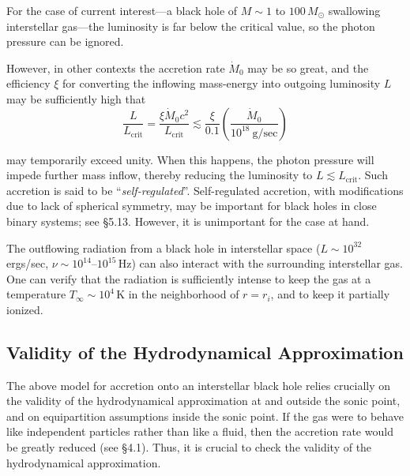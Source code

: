 For the case of current interest---a black hole of $M\sim 1$ to $100\,M_\odot$ swallowing
interstellar gas---the luminosity is far below the critical value, so the photon
pressure can be ignored.

However, in other contexts the accretion rate $\dot{M}_0$ may be so great, and the
efficiency $\xi$ for converting the inflowing mass-energy into outgoing luminosity
$L$ may be sufficiently high that
%
\begin{equation}
\frac{L}{L_{\text{crit}}} = \frac{\xi \dot{M}_0 c^2}{L_{\text{crit}}}
\lesssim \frac{\xi}{0.1} \left(\frac{\dot{M}_0}{10^{18}~\text{g/sec}}\right)
\tag{4.5.5}
\end{equation}

may temporarily exceed unity.  When this happens, the photon pressure will
impede further mass inflow, thereby reducing the luminosity to $L \lesssim L_{\text{crit}}$.  Such
accretion is said to be ``\emph{self-regulated}''.  Self-regulated accretion, with modifications due to lack of spherical symmetry, may be important for black holes in
close binary systems; see \S5.13.  However, it is unimportant for the case at
hand.

The outflowing radiation from a black hole in interstellar space ($L \sim 10^{32}$
ergs/sec, $\nu \sim 10^{14}$--$10^{15}$\,Hz) can also interact with the surrounding interstellar
gas.  One can verify that the radiation is sufficiently intense to keep the gas at a
temperature $T_\infty \sim 10^4$\,K in the neighborhood of $r = r_i$, and to keep it partially
ionized.


\subsection{Validity of the Hydrodynamical Approximation}
\label{sec:4.6}

The above model for accretion onto an interstellar black hole relies crucially on
the validity of the hydrodynamical approximation at and outside the sonic point,
and on equipartition assumptions inside the sonic point.  If the gas were to behave
like independent particles rather than like a fluid, then the accretion rate would
be greatly reduced (see \S4.1).  Thus, it is crucial to check the validity of the
hydrodynamical approximation.

